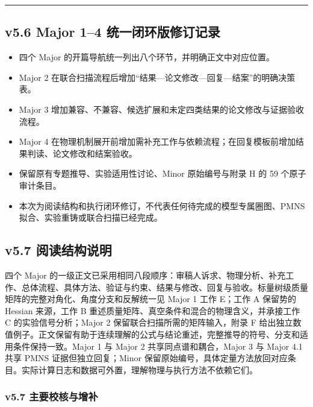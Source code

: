 \documentclass[
  chinese,
  UTF8]{ctexart}
\providecommand{\tightlist}{%
  \setlength{\itemsep}{0pt}\setlength{\parskip}{0pt}}
\begin{document}
\begin{center}\rule{0.5\linewidth}{0.5pt}\end{center}

\subsection{v5.6 Major 1--4
统一闭环版修订记录}\label{v5.6-major-14-ux7edfux4e00ux95edux73afux7248ux4feeux8ba2ux8bb0ux5f55}

\begin{itemize}
\tightlist
\item
  四个 Major 的开篇导航统一列出八个环节，并明确正文中对应位置。
\item
  Major 2
  在联合扫描流程后增加``结果---论文修改---回复---结案''的明确决策表。
\item
  Major 3
  增加兼容、不兼容、候选扩展和未定四类结果的论文修改与证据验收流程。
\item
  Major 4
  在物理机制展开前增加需补充工作与依赖流程；在回复模板前增加结果判读、论文修改和结案验收。
\item
  保留原有专题推导、实验适用性讨论、Minor 原始编号与附录 H 的 59
  个原子审计条目。
\item
  本次为阅读结构和执行闭环修订，不代表任何待完成的模型专属圈图、PMNS
  拟合、实验重铸或联合扫描已经完成。
\end{itemize}

\subsection{v5.7
阅读结构说明}\label{v5.7-ux9605ux8bfbux7ed3ux6784ux8bf4ux660e}

四个 Major
的一级正文已采用相同八段顺序：审稿人诉求、物理分析、补充工作、总体流程、具体方法、验证与约束、结果与修改、回复与验收。标量树级质量矩阵的完整对角化、角度分支和反解统一见
Major 1 工作 E；工作 A 保留势的 Hessian 来源，工作 B
重述质量矩阵、真空条件和混合的物理含义，并承接工作 C
的实验信号分析；Major 2 保留联合扫描所需的矩阵输入，附录 F
给出独立数值例子。正文保留有助于连续理解的公式与结论重述，完整推导的符号、分支和适用条件保持一致。Major
1 与 Major 2 共享同点谱和耦合，Major 3 与 Major 4.1 共享 PMNS
证据但独立回复；Minor
保留原始编号，具体定量方法放回对应条目。实际计算日志和数据可外置，理解物理与执行方法不依赖它们。

\subsubsection{v5.7
主要校核与增补}\label{v5.7-ux4e3bux8981ux6821ux6838ux4e0eux589eux8865}
\end{document}
